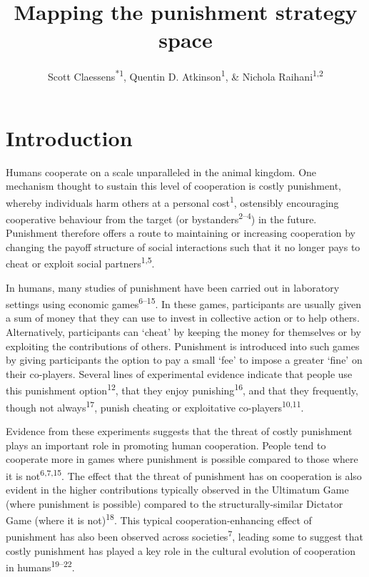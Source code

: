 \documentclass[
  man,floatsintext]{apa6}
\title{Mapping the punishment strategy space}
\author{Scott Claessens\textsuperscript{*1}, Quentin D. Atkinson\textsuperscript{1}, \& Nichola Raihani\textsuperscript{1,2}}
\date{}
\affiliation{\vspace{0.5cm}\textsuperscript{1} \footnotesize School of Psychology, University of Auckland, Auckland, New Zealand\\\textsuperscript{2} \footnotesize Department of Experimental Psychology, University College London, London, United Kingdom}
\begin{document}
\maketitle

\linenumbers

\hypertarget{introduction}{%
\section{Introduction}\label{introduction}}

Humans cooperate on a scale unparalleled in the animal kingdom. One mechanism thought to sustain this level of cooperation is costly punishment, whereby individuals harm others at a personal cost\textsuperscript{1}, ostensibly encouraging cooperative behaviour from the target (or bystanders\textsuperscript{2--4}) in the future. Punishment therefore offers a route to maintaining or increasing cooperation by changing the payoff structure of social interactions such that it no longer pays to cheat or exploit social partners\textsuperscript{1,5}.

In humans, many studies of punishment have been carried out in laboratory settings using economic games\textsuperscript{6--15}. In these games, participants are usually given a sum of money that they can use to invest in collective action or to help others. Alternatively, participants can `cheat' by keeping the money for themselves or by exploiting the contributions of others. Punishment is introduced into such games by giving participants the option to pay a small `fee' to impose a greater `fine' on their co-players. Several lines of experimental evidence indicate that people use this punishment option\textsuperscript{12}, that they enjoy punishing\textsuperscript{16}, and that they frequently, though not always\textsuperscript{17}, punish cheating or exploitative co-players\textsuperscript{10,11}.

Evidence from these experiments suggests that the threat of costly punishment plays an important role in promoting human cooperation. People tend to cooperate more in games where punishment is possible compared to those where it is not\textsuperscript{6,7,15}. The effect that the threat of punishment has on cooperation is also evident in the higher contributions typically observed in the Ultimatum Game (where punishment is possible) compared to the structurally-similar Dictator Game (where it is not)\textsuperscript{18}. This typical cooperation-enhancing effect of punishment has also been observed across societies\textsuperscript{7}, leading some to suggest that costly punishment has played a key role in the cultural evolution of cooperation in humans\textsuperscript{19--22}.
\end{document}
